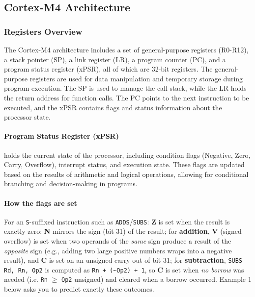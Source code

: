 \subsection{Cortex-M4 Architecture}
\subsubsection{Registers Overview}
The Cortex-M4 architecture includes a set of general-purpose registers (R0-R12), a stack pointer (SP), a link register (LR), a program counter (PC), and a program status register (xPSR), all of which are 32-bit registers. The general-purpose registers are used for data manipulation and temporary storage during program execution. The SP is used to manage the call stack, while the LR holds the return address for function calls. The PC points to the next instruction to be executed, and the xPSR contains flags and status information about the processor state.
\paragraph{Program Status Register (xPSR)}
holds the current state of the processor, including condition flags (Negative, Zero, Carry, Overflow), interrupt status, and execution state. These flags are updated based on the results of arithmetic and logical operations, allowing for conditional branching and decision-making in programs.

\paragraph{How the flags are set}
For an \texttt{S}-suffixed instruction such as \texttt{ADDS}/\texttt{SUBS}: \textbf{Z} is set when the result is exactly zero; \textbf{N} mirrors the sign (bit 31) of the result; for \textbf{addition}, \textbf{V} (signed overflow) is set when two operands of the \emph{same} sign produce a result of the \emph{opposite} sign (e.g., adding two large positive numbers wraps into a negative result), and \textbf{C} is set on an unsigned carry out of bit 31; for \textbf{subtraction}, \texttt{SUBS Rd, Rn, Op2} is computed as \texttt{Rn + (\textasciitilde Op2) + 1}, so \textbf{C} is set when \emph{no borrow} was needed (i.e. \texttt{Rn} $\geq$ \texttt{Op2} unsigned) and cleared when a borrow occurred. Example 1 below asks you to predict exactly these outcomes.

